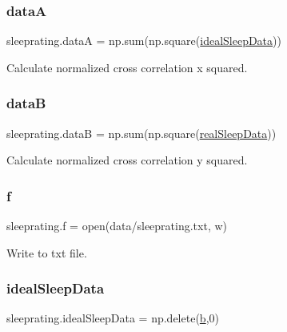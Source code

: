 \subsubsection{\texorpdfstring{dataA}{dataA}}
{\footnotesize\ttfamily sleeprating.\+dataA = np.\+sum(np.\+square(\mbox{\hyperlink{namespacesleeprating_a9e349b9812b2428e147dc1612fa5126d}{ideal\+Sleep\+Data}}))}



Calculate normalized cross correlation x squared. 

\mbox{\label{namespacesleeprating_ab660d30857a5b0d3afabc6a91d7b24e2}} 
\subsubsection{\texorpdfstring{dataB}{dataB}}
{\footnotesize\ttfamily sleeprating.\+dataB = np.\+sum(np.\+square(\mbox{\hyperlink{namespacesleeprating_a69adab626860ce563388eca964e80eb0}{real\+Sleep\+Data}}))}



Calculate normalized cross correlation y squared. 

\mbox{\label{namespacesleeprating_add5fbadc2a13bb8abfecdd2f4523ffe4}} 
\subsubsection{\texorpdfstring{f}{f}}
{\footnotesize\ttfamily sleeprating.\+f = open(\textquotesingle{}data/sleeprating.\+txt\textquotesingle{}, \textquotesingle{}w\textquotesingle{})}



Write to txt file. 

\mbox{\label{namespacesleeprating_a9e349b9812b2428e147dc1612fa5126d}} 
\subsubsection{\texorpdfstring{ideal\+Sleep\+Data}{idealSleepData}}
{\footnotesize\ttfamily sleeprating.\+ideal\+Sleep\+Data = np.\+delete(\mbox{\hyperlink{namespacesleeprating_a0daef533b07f6252a2dad70552a90082}{b}},0)}



